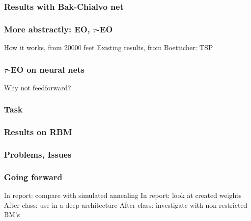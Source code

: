 \documentclass{beamer}
\begin{document}
\begin{frame}
  \frametitle{Results with Bak-Chialvo net}
\end{frame}

\begin{frame}
  \frametitle{More abstractly: EO, $\tau$-EO}
  How it works, from 20000 feet
  Existing results, from Boetticher: TSP
\end{frame}

\begin{frame}
  \frametitle{$\tau$-EO on neural nets}
  Why not feedforward?
\end{frame}


\begin{frame}
  \frametitle{Task}
\end{frame}

\begin{frame}
  \frametitle{Results on RBM}
\end{frame}

\begin{frame}
  \frametitle{Problems, Issues}

\end{frame}

\begin{frame}
  \frametitle{Going forward}
  In report: compare with simulated annealing
  In report: look at created weights
  After class: use in a deep architecture
  After class: investigate with non-restricted BM's
\end{frame}
\end{document}
